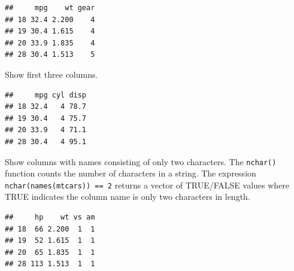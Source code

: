 \documentclass[
]{book}
\newenvironment{Shaded}{\begin{snugshade}}{\end{snugshade}}
\newcommand{\DecValTok}[1]{\textcolor[rgb]{0.00,0.00,0.81}{#1}}
\newcommand{\FunctionTok}[1]{\textcolor[rgb]{0.00,0.00,0.00}{#1}}
\newcommand{\NormalTok}[1]{#1}
\newcommand{\SpecialCharTok}[1]{\textcolor[rgb]{0.00,0.00,0.00}{#1}}
\newcommand{\StringTok}[1]{\textcolor[rgb]{0.31,0.60,0.02}{#1}}
\begin{document}
\begin{Shaded}
\end{Shaded}

\begin{verbatim}
##     mpg    wt gear
## 18 32.4 2.200    4
## 19 30.4 1.615    4
## 20 33.9 1.835    4
## 28 30.4 1.513    5
\end{verbatim}

Show first three columns.

\begin{Shaded}
\end{Shaded}

\begin{verbatim}
##     mpg cyl disp
## 18 32.4   4 78.7
## 19 30.4   4 75.7
## 20 33.9   4 71.1
## 28 30.4   4 95.1
\end{verbatim}

Show columns with names consisting of only two characters. The \texttt{nchar()} function counts the number of characters in a string. The expression \texttt{nchar(names(mtcars))\ ==\ 2} returns a vector of TRUE/FALSE values where TRUE indicates the column name is only two characters in length.

\begin{Shaded}
\end{Shaded}

\begin{verbatim}
##     hp    wt vs am
## 18  66 2.200  1  1
## 19  52 1.615  1  1
## 20  65 1.835  1  1
## 28 113 1.513  1  1
\end{verbatim}
\end{document}
